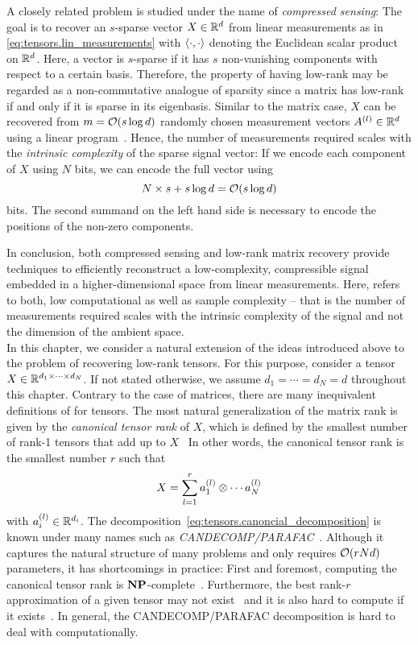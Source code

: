 A closely related problem is studied under the name of \emph{compressed sensing}:
The goal is to recover an $s$-sparse vector $X \in {\mathbb{R}}^d$ from linear measurements as in \cref{eq:tensors.lin_measurements} with $\braket{\cdot, \cdot}$ denoting the Euclidean scalar product on ${\mathbb{R}}^d$.
Here, a vector is $s$-sparse if it has $s$ non-vanishing components with respect to a certain basis.
Therefore, the property of having low-rank may be regarded as a non-commutative analogue of sparsity since a matrix has low-rank if and only if it is sparse in its eigenbasis.
Similar to the matrix case, $X$ can be recovered from $m = {\mathcal{O}}(s \log d)$ randomly chosen measurement vectors $A^{(l)} \in {\mathbb{R}}^d$ using a linear program~\cite{Foucart_2013_Mathematical}.
Hence, the number of measurements required scales with the \emph{intrinsic complexity} of the sparse signal vector:
If we encode each component of $X$ using $N$ bits, we can encode the full vector using
\[
  N \times s + s \log d = {\mathcal{O}}(s \log d)
\]
bits.
The second summand on the left hand side is necessary to encode the positions of the non-zero components.

In conclusion, both compressed sensing and low-rank matrix recovery provide techniques to efficiently reconstruct a low-complexity, compressible signal embedded in a higher-dimensional space from linear measurements.
Here,  refers to both, low computational as well as sample complexity -- that is the number of measurements required scales with the intrinsic complexity of the signal and not the dimension of the ambient space.\\



In this chapter, we consider a natural extension of the ideas introduced above to the problem of recovering low-rank tensors.
For this purpose, consider a tensor $X \in {\mathbb{R}}^{d_1 \times \cdots \times d_N}$.
If not stated otherwise, we assume $d_1 = \cdots = d_N = d$ throughout this chapter.
Contrary to the case of matrices, there are many inequivalent definitions of  for tensors.
The most natural generalization of the matrix rank is given by the \emph{canonical tensor rank} of $X$, which is defined by the smallest number of rank-1 tensors that add up to $X$~\cite{Kolda_2009_Tensor}
In other words, the canonical tensor rank is the smallest number $r$ such that
\[
  X = \sum_{l=1}^r a^{(l)}_1 \otimes \cdots a^{(l)}_N
  \label{eq:tensors.canonical_decomposition}
\]
with $a^{(l)}_i \in {\mathbb{R}}^{d_i}$.
The decomposition~\eqref{eq:tensors.canoncial_decomposition} is known under many names such as \emph{CANDECOMP/PARAFAC}~\cite{Kolda_2009_Tensor}.
Although it captures the natural structure of many problems and only requires ${\mathcal{O}}(r N d)$ parameters, it has shortcomings in practice:
First and foremost, computing the canonical tensor rank is $\mathbf{NP}$-complete~\cite{Hastad_1990_Tensor}.
Furthermore, the best rank-$r$ approximation of a given tensor may not exist~\cite{Kolda_2009_Tensor} and it is also hard to compute if it exists~\cite{Hillar_2013_Most}.
In general, the CANDECOMP/PARAFAC decomposition is hard to deal with computationally.

